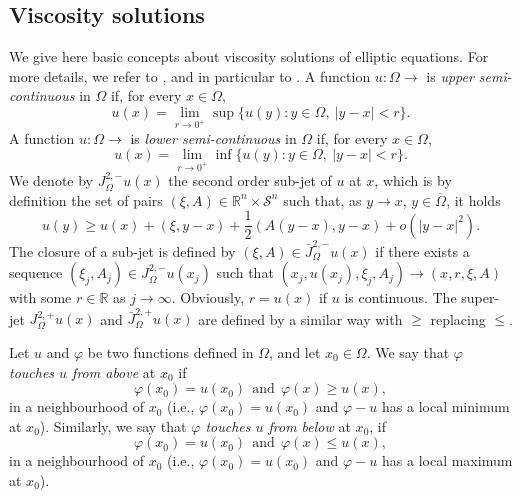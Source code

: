 \documentclass[12pt]{amsart}
\newcommand{\R}{\mathbb R}
\newcommand{\1}{\mathbf 1}
\begin{document}
\subsection{Viscosity solutions}
We give here basic concepts about viscosity solutions of elliptic equations. For more details, we refer to \cite{Crandall1995, Ishii-Lions1992, Katzourakis, Koike}, and in particular to \cite{Juutinen2001}.
A function $u:\Omega \rightarrow $ is {\it upper semi-continuous} in $\Omega$ if, for every $x\in\Omega$,
\[
u(x)=\mathop{\lim}_{r\rightarrow 0^+} \sup \{u(y):y\in \Omega,\ |y-x|<r\}.
\]
A function $u:\Omega \rightarrow $ is {\it lower semi-continuous} in $\Omega$ if, for every $x\in\Omega$,
\[
u(x)=\mathop{\lim}_{r\rightarrow 0^+} \inf \{u(y):y\in \Omega,\ |y-x|<r\}.
\]
We denote by $J^{2,-}_\Omega u (x)$ the second order sub-jet of $u$ at $x$, which is by definition the set of pairs $(\xi,A)\in \R^n \times \mathcal{S}^n$ such that, as $y \rightarrow x$, $y\in \overline{\Omega}$, it holds
\begin{equation}
u(y) \geq u(x)+(\xi, y-x)+\frac{1}{2}(A(y-x),y-x)+o(|y-x|^2).
\end{equation}
The closure of a sub-jet is defined by $(\xi,A)\in \bar{J}^{2,-}_\Omega u(x)$ if there exists a sequence $(\xi_j,A_j)\in J^{2,-}_\Omega u(x_j)$ such that $(x_j,u(x_j),\xi_j,A_j)\rightarrow (x,r,\xi,A)$ with some $r\in \R$ as $j\rightarrow \infty$. Obviously, $r=u(x)$ if $u$ is continuous. The super-jet $J^{2,+}_\Omega u(x)$ and $\bar{J}^{2,+}_\Omega u(x)$ are defined by a similar way with $\geq $ replacing $\leq $.

Let $u$ and $\varphi$ be two functions defined in $\Omega$, and let $x_0\in \Omega$. We say that {\it $\varphi$ touches $u$ from above} at $x_0$ if
\[
\varphi(x_0)=u(x_0)\ \ \text{and}\ \ \varphi(x)\geq u(x),
\]
in a neighbourhood of $x_0$ (i.e., $\varphi(x_0)=u(x_0)$ and $\varphi-u$ has a local minimum at $x_0$). Similarly, we say that {\it $\varphi$ touches $u$ from below} at $x_0$, if
\[
\varphi(x_0)=u(x_0)\ \ \text{and}\ \ \varphi(x)\leq u(x),
\]
in a neighbourhood of $x_0$ (i.e., $\varphi(x_0)=u(x_0)$ and $\varphi-u$ has a local maximum at $x_0$).
\end{document}
